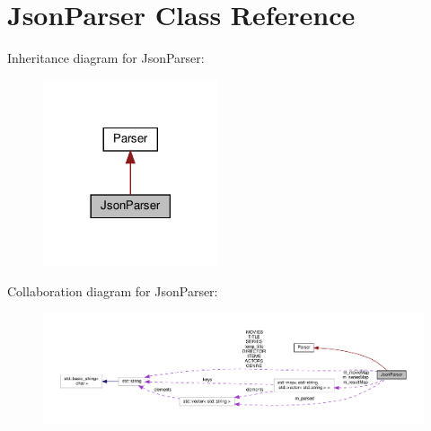 \hypertarget{classJsonParser}{}\section{Json\+Parser Class Reference}
\label{classJsonParser}


Inheritance diagram for Json\+Parser\+:\nopagebreak
\begin{figure}[H]
\begin{center}
\leavevmode
\includegraphics[width=146pt]{classJsonParser__inherit__graph}
\end{center}
\end{figure}


Collaboration diagram for Json\+Parser\+:\nopagebreak
\begin{figure}[H]
\begin{center}
\leavevmode
\includegraphics[width=350pt]{classJsonParser__coll__graph}
\end{center}
\end{figure}
